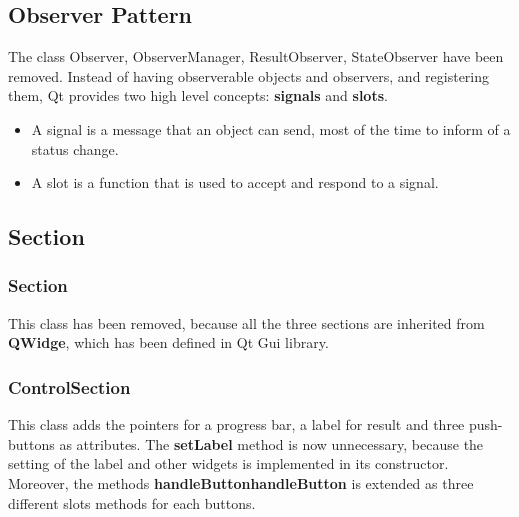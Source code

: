 \documentclass[parskip=full]{scrartcl}
\newcommand\tab[1][1cm]{\hspace*{#1}}
\begin{document}
    \subsection{Observer Pattern}
        \tab The class Observer, ObserverManager, ResultObserver, StateObserver have been removed. Instead of having observerable objects and observers, and registering them, Qt provides two high level concepts: \textbf{signals} and \textbf{slots}.  
        \begin{itemize}
            \item A signal is a message that an object can send, most of the time to inform of a status change.
            \item A slot is a function that is used to accept and respond to a signal.
        \end{itemize}
    
    \subsection{Section}
    \subsubsection{Section}
        \tab This class has been removed, because all the three sections are inherited from \textbf{QWidge}, which has been defined in Qt Gui library.
        
    \subsubsection{ControlSection}
        \tab This class adds the pointers for a progress bar, a label for result and three push-buttons as attributes. The \textbf{setLabel} method is now unnecessary, because the setting of the label and other widgets is implemented in its constructor. Moreover, the methods \textbf{handleButtonhandleButton} is extended as three different slots methods for each buttons.
        
\end{document}

